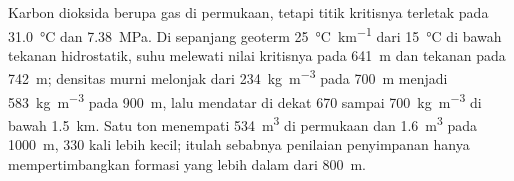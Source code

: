 Karbon dioksida berupa gas di permukaan, tetapi titik kritisnya terletak pada \qty{31.0}{\celsius} dan
\qty{7.38}{MPa}. Di sepanjang geoterm \qty{25}{\celsius\per\km} dari \qty{15}{\celsius} di bawah
tekanan hidrostatik, suhu melewati nilai kritisnya pada \qty{641}{m} dan tekanan pada
\qty{742}{m}; densitas  murni melonjak dari \qty{234}{kg.m^{-3}} pada \qty{700}{m} menjadi
\qty{583}{kg.m^{-3}} pada \qty{900}{m}, lalu mendatar di dekat 670 sampai \qty{700}{kg.m^{-3}} di bawah
\qty{1.5}{km}. Satu ton menempati \qty{534}{m^3} di permukaan dan \qty{1.6}{m^3} pada \qty{1000}{m},
330 kali lebih kecil; itulah sebabnya penilaian penyimpanan hanya mempertimbangkan formasi yang lebih dalam dari
\qty{800}{m}.


